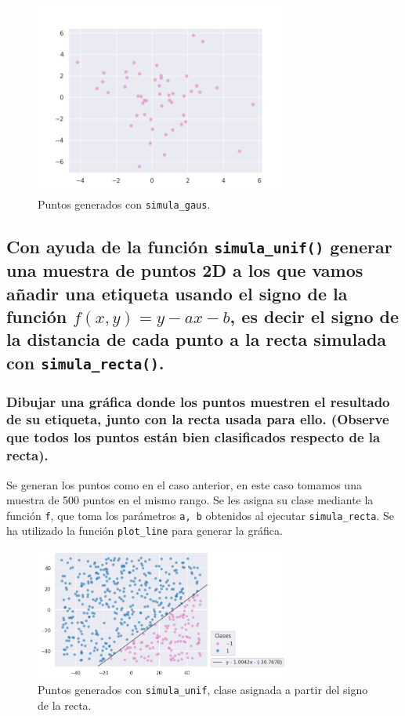 \documentclass[a4paper, 20pt]{article}
\begin{document}
\begin{figure}[H]
    \centering
    \includegraphics[width=0.75\textwidth]{points1b}
    \caption{Puntos generados con \texttt{simula\_gaus}.}
    \label{fig:1b}
\end{figure}

\subsection{Con ayuda de la función \texttt{simula\_unif()} generar una muestra de puntos 2D a los que vamos añadir una etiqueta usando el signo de la función $f(x, y) = y - ax - b$, es decir el signo de la distancia de cada punto a la recta simulada con \texttt{simula\_recta()}.}
\subsubsection{Dibujar una gráfica donde los puntos muestren el resultado de su etiqueta, junto con la recta usada para ello. (Observe que todos los puntos están bien clasificados respecto de la recta).}

Se generan los puntos como en el caso anterior, en este caso tomamos una muestra de 500 puntos en el mismo rango. Se les asigna su clase mediante la función \texttt{f}, que toma los parámetros \texttt{a, b} obtenidos al ejecutar \texttt{simula\_recta}. Se ha utilizado la función \texttt{plot\_line} para generar la gráfica.

\begin{figure}[H]
    \centering
    \includegraphics[width=0.75\textwidth]{recta}
    \caption{Puntos generados con \texttt{simula\_unif}, clase asignada a partir del signo de la recta.}
    \label{fig:recta}
\end{figure}
\end{document}
